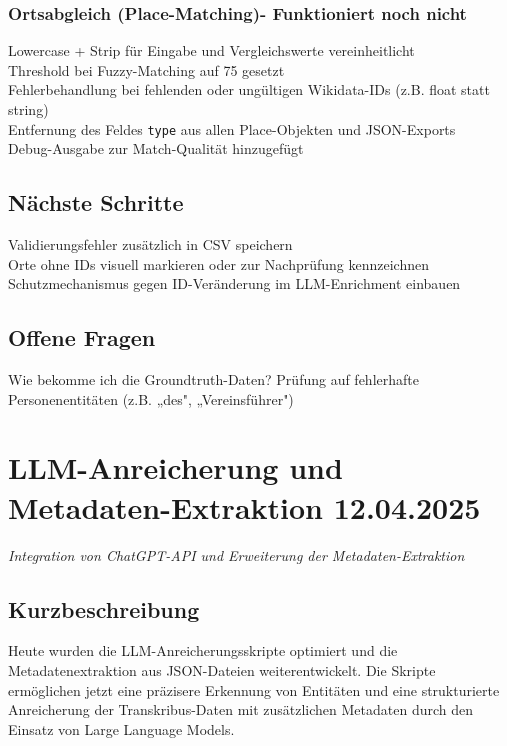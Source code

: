 \documentclass{article}
\begin{document}
\subsubsection*{\small Ortsabgleich (Place-Matching)- Funktioniert noch nicht}
 Lowercase + Strip für Eingabe und Vergleichswerte vereinheitlicht\\
 Threshold bei Fuzzy-Matching auf 75 gesetzt\\
 Fehlerbehandlung bei fehlenden oder ungültigen Wikidata-IDs (z.B. float statt string)\\
 Entfernung des Feldes \texttt{type} aus allen Place-Objekten und JSON-Exports\\
 Debug-Ausgabe zur Match-Qualität hinzugefügt

\subsection*{Nächste Schritte}
 Validierungsfehler zusätzlich in CSV speichern\\
 Orte ohne IDs visuell markieren oder zur Nachprüfung kennzeichnen\\
 Schutzmechanismus gegen ID-Veränderung im LLM-Enrichment einbauen

\subsection*{Offene Fragen}
 Wie bekomme ich die Groundtruth-Daten?
 Prüfung auf fehlerhafte Personenentitäten (z.B. „des", „Vereinsführer")\\




\noindent\hrulefill

\section{LLM-Anreicherung und Metadaten-Extraktion \small 12.04.2025}
\small\textit{Integration von ChatGPT-API und Erweiterung der Metadaten-Extraktion}\\
\subsection*{Kurzbeschreibung}

Heute wurden die LLM-Anreicherungsskripte optimiert und die Metadatenextraktion aus JSON-Dateien weiterentwickelt. Die Skripte ermöglichen jetzt eine präzisere Erkennung von Entitäten und eine strukturierte Anreicherung der Transkribus-Daten mit zusätzlichen Metadaten durch den Einsatz von Large Language Models.
\end{document}
